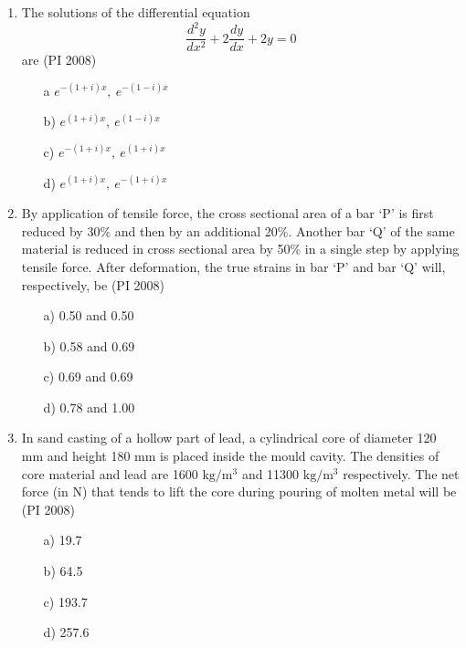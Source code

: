 \documentclass[journal,12pt,onecolumn]{IEEEtran}
\theoremstyle{remark}
\begin{document}
\begin{enumerate}
\item %
The solutions of the differential equation 
\[
\frac{d^{2}y}{dx^{2}} + 2 \frac{dy}{dx} + 2y = 0
\]
are  
\hfill{(PI 2008)}
\begin{multicols}{4}
    \begin{enumerate}
\item[a] $e^{-(1+i)x},\ e^{-(1-i)x}$
\item[b)] $e^{(1+i)x},\ e^{(1-i)x}$
\item[c)] $e^{-(1+i)x},\ e^{(1+i)x}$
\item[d)] $e^{(1+i)x},\ e^{-(1+i)x}$
\end{enumerate}
    \end{multicols}
\vspace{1cm}

\item %
By application of tensile force, the cross sectional area of a bar `P' is first reduced by 30\% and then by an additional 20\%. Another bar `Q' of the same material is reduced in cross sectional area by 50\% in a single step by applying tensile force. After deformation, the true strains in bar `P' and bar `Q' will, respectively, be  \hfill{(PI 2008)}
\begin{multicols}{4}
    \begin{enumerate}
\item[a)] 0.50 and 0.50
\item[b)] 0.58 and 0.69
\item[c)] 0.69 and 0.69
\item[d)] 0.78 and 1.00
\end{enumerate}
    \end{multicols}
\vspace{1cm}

\item %
In sand casting of a hollow part of lead, a cylindrical core of diameter 120 mm and height 180 mm is placed inside the mould cavity. The densities of core material and lead are 1600 $\mathrm{kg/m^3}$ and 11300 $\mathrm{kg/m^3}$ respectively. The net force (in N) that tends to lift the core during pouring of molten metal will be  \hfill{(PI 2008)}
\begin{multicols}{4}
    \begin{enumerate}
\item[a)] 19.7
\item[b)] 64.5
\item[c)] 193.7
\item[d)] 257.6
\end{enumerate}
\end{multicols}
\vspace{1cm}


\end{enumerate}
\end{document}

